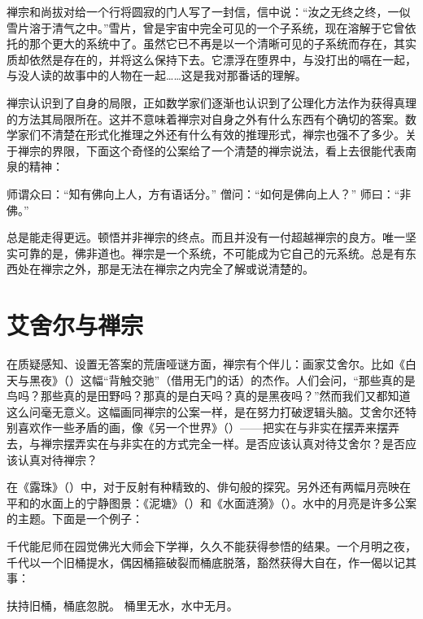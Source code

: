 禅宗和尚拔对给一个行将圆寂的门人写了一封信，信中说：“汝之无终之终，一似雪片溶于清气之中。”雪片，曾是宇宙中完全可见的一个子系统，现在溶解于它曾依托的那个更大的系统中了。虽然它已不再是以一个清晰可见的子系统而存在，其实质却依然是存在的，并将这么保持下去。它漂浮在堕界中，与没打出的嗝在一起，与没人读的故事中的人物在一起……这是我对那番话的理解。

禅宗认识到了自身的局限，正如数学家们逐渐也认识到了公理化方法作为获得真理的方法其局限所在。这并不意味着禅宗对自身之外有什么东西有个确切的答案。数学家们不清楚在形式化推理之外还有什么有效的推理形式，禅宗也强不了多少。关于禅宗的界限，下面这个奇怪的公案给了一个清楚的禅宗说法，看上去很能代表南泉的精神：

\begin{zenkoan}
师谓众曰：“知有佛向上人，方有语话分。”
僧问：“如何是佛向上人？”
师曰：“非佛。”
\end{zenkoan}

总是能走得更远。顿悟并非禅宗的终点。而且并没有一付超越禅宗的良方。唯一坚实可靠的是，佛非道也。禅宗是一个系统，不可能成为它自己的元系统。总是有东西处在禅宗之外，那是无法在禅宗之内完全了解或说清楚的。

\section{艾舍尔与禅宗}

在质疑感知、设置无答案的荒唐哑谜方面，禅宗有个伴儿：画家艾舍尔。比如《白天与黑夜》（）这幅“背触交驰”（借用无门的话）的杰作。人们会问，“那些真的是鸟吗？那些真的是田野吗？那真的是白天吗？真的是黑夜吗？”然而我们又都知道这么问毫无意义。这幅画同禅宗的公案一样，是在努力打破逻辑头脑。艾舍尔还特别喜欢作一些矛盾的画，像《另一个世界》（）——把实在与非实在摆弄来摆弄去，与禅宗摆弄实在与非实在的方式完全一样。是否应该认真对待艾舍尔？是否应该认真对待禅宗？

在《露珠》（）中，对于反射有种精致的、俳句般的探究。另外还有两幅月亮映在平和的水面上的宁静图景：《泥塘》（）和《水面涟漪》（）。水中的月亮是许多公案的主题。下面是一个例子：

\begin{zenkoan}
千代能尼师在园觉佛光大师会下学禅，久久不能获得参悟的结果。一个月明之夜，千代以一个旧桶提水，偶因桶箍破裂而桶底脱落，豁然获得大自在，作一偈以记其事：
\begin{zenkoan}
扶持旧桶，桶底忽脱。
桶里无水，水中无月。
\end{zenkoan}
\end{zenkoan}


